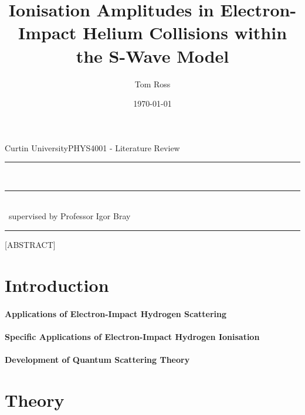 \documentclass[draft]{article}
\title{Ionisation Amplitudes in Electron-Impact Helium Collisions within the
  S-Wave Model}
\author{Tom Ross}
\date{\today}
\gdef\theassessment{PHYS4001 - Literature Review}
\gdef\thesupervisor{Professor Igor Bray}
\gdef\theinstitution{Curtin University}
\begin{document}

\begin{titlepage}
  \begin{flushleft}
    \theinstitution \hfill \theassessment
  \end{flushleft}
  \hrule
  \begin{center}
    {
      \huge
      \thetitle
    }
    ~\\
    \rule[1.0pt]{8.5cm}{0.4pt}
    ~\\
    {
      \large
      \theauthor ~supervised by \thesupervisor
    }
  \end{center}
  \hrule
  \begin{center}
    [ABSTRACT]
  \end{center}
\end{titlepage}

\clearpage


\tableofcontents

\listoffigures

\listoftables


\clearpage

\section{Introduction}
\label{sec:introduction}

\paragraph{Applications of Electron-Impact Hydrogen Scattering}

\paragraph{Specific Applications of Electron-Impact Hydrogen Ionisation}

\paragraph{Development of Quantum Scattering Theory}

\section{Theory}
\label{sec:theory}

\end{document}
